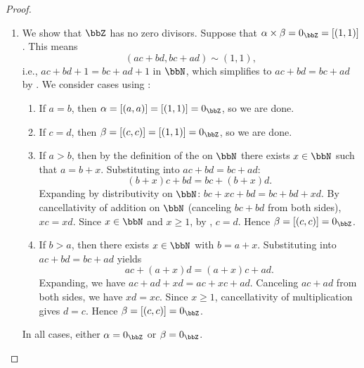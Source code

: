 \begin{proof}
\begin{enumerate}
    \item We show that $\bbZ$ has no zero divisors. Suppose that $\alpha \times \beta = 0_\bbZ = [(1,1)]$. This means
    $$(ac + bd, bc + ad) \sim (1, 1),$$
    i.e., $ac + bd + 1 = bc + ad + 1$ in $\bbN$, which simplifies to $ac + bd = bc + ad$ by . We consider cases using :
    \begin{enumerate}
        \item If $a = b$, then $\alpha = [(a,a)] = [(1,1)] = 0_\bbZ$, so we are done.
        \item If $c = d$, then $\beta = [(c,c)] = [(1,1)] = 0_\bbZ$, so we are done.
        \item If $a > b$, then by the definition of the  on $\bbN$ there exists $x \in \bbN$ such that $a = b + x$. Substituting into $ac + bd = bc + ad$:
        $$(b+x)c + bd = bc + (b+x)d.$$
        Expanding by distributivity on $\bbN$: $bc + xc + bd = bc + bd + xd$. By cancellativity of addition on $\bbN$ (canceling $bc + bd$ from both sides), $xc = xd$. Since $x \in \bbN$ and $x \geq 1$, by , $c = d$. Hence $\beta = [(c,c)] = 0_\bbZ$.
        \item If $b > a$, then there exists $x \in \bbN$ with $b = a + x$. Substituting into $ac + bd = bc + ad$ yields
        $$ac + (a+x)d = (a+x)c + ad.$$
        Expanding, we have $ac + ad + xd = ac + xc + ad$. Canceling $ac + ad$ from both sides, we have $xd = xc$. Since $x \geq 1$, cancellativity of multiplication gives $d = c$. Hence $\beta = [(c,c)] = 0_\bbZ$.
    \end{enumerate}
    In all cases, either $\alpha = 0_\bbZ$ or $\beta = 0_\bbZ$.
\end{enumerate}
\end{proof}
